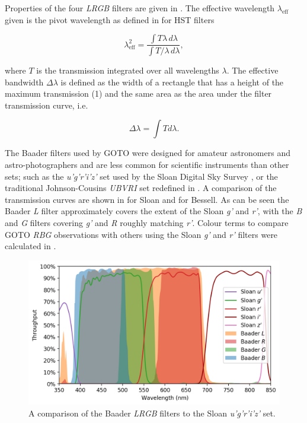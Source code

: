 \begin{colsection}
\begin{colsection}
Properties of the four \textit{LRGB} filters are given in . The effective wavelength $\lambda_\text{eff}$ given is the pivot wavelength as defined in \citet{HST_calibration} for HST filters

\begin{equation}
    \lambda_\text{eff}^2 = \frac{\int T\lambda \, d\lambda}{\int T/\lambda \, d\lambda},
    \label{eq:pivot_wavelength}
\end{equation}

where $T$ is the transmission integrated over all wavelengths $\lambda$. The effective bandwidth $\Delta\lambda$ is defined as the width of a rectangle that has a height of the maximum transmission (1) and the same area as the area under the filter transmission curve, i.e.

\begin{equation}
    \Delta\lambda = \int T d\lambda.
    \label{eq:bandwidth}
\end{equation}

The Baader filters used by GOTO were designed for amateur astronomers and astro-photographers and are less common for scientific instruments than other sets; such as the \textit{u'g'r'i'z'} set used by the Sloan Digital Sky Survey \citep{Sloan_filters}, or the traditional Johnson-Cousins \textit{UBVRI} set redefined in \citet{Bessell_filters}. A comparison of the transmission curves are shown in  for Sloan and  for Bessell. As can be seen the Baader \textit{L} filter approximately covers the extent of the Sloan \textit{g'} and \textit{r'}, with the \textit{B} and \textit{G} filters covering \textit{g'} and \textit{R} roughly matching \textit{r'}. Colour terms to compare GOTO \textit{RBG} observations with others using the Sloan \textit{g'} and \textit{r'} filters were calculated in \citet{Phaethon}.

\newpage

\begin{figure}[t]
    \begin{center}
        \includegraphics[width=\textwidth]{images/throughput/filt_comp1.png}
    \end{center}
    \caption[Comparison of Baader and Sloan filters]{
        A comparison of the Baader \textit{LRGB} filters to the Sloan \textit{u'g'r'i'z'} set.
    }\label{fig:filter_comparison1}
\end{figure}


\end{colsection}
\end{colsection}
